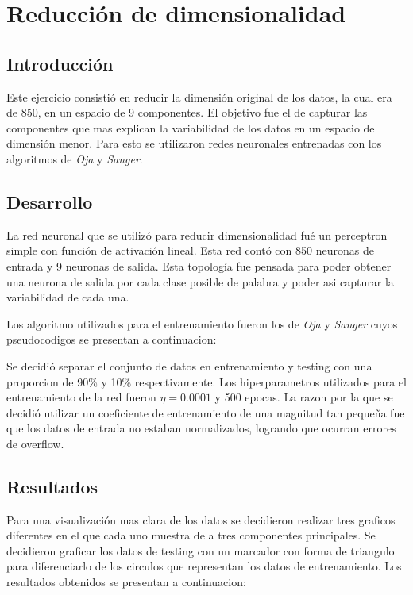 \section{Reducción de dimensionalidad}

\subsection{Introducción}
Este ejercicio consistió en reducir la dimensión original de los datos, la cual era de 850, en un espacio de 9 componentes. El objetivo fue el de capturar
las componentes que mas explican la variabilidad de los datos en un espacio de dimensión menor. Para esto se utilizaron redes neuronales entrenadas con
los algoritmos de \textit{Oja} y \textit{Sanger}.

\subsection{Desarrollo}
La red neuronal que se utilizó para reducir dimensionalidad fué un perceptron simple con función de activación lineal. Esta red contó con 850 neuronas de entrada y
 9 neuronas de salida. Esta topología fue pensada para poder obtener una neurona de salida por cada clase posible de palabra y poder asi capturar la variabilidad de cada
 una.

Los algoritmo utilizados para el entrenamiento fueron los de \textit{Oja} y \textit{Sanger} cuyos pseudocodigos se presentan a continuacion:

Se decidió separar el conjunto de datos en entrenamiento y testing con una proporcion de 90\% y 10\% respectivamente. Los hiperparametros utilizados para el entrenamiento
de la red fueron $\eta = 0.0001$ y 500 epocas. La razon por la que se decidió utilizar un coeficiente de entrenamiento de una magnitud tan pequeña fue que los datos de entrada
no estaban normalizados, logrando que ocurran errores de overflow.

\subsection{Resultados}
Para una visualización mas clara de los datos se decidieron realizar tres graficos diferentes en el que cada uno muestra de a tres componentes principales. Se decidieron graficar los
datos de testing con un marcador con forma de triangulo para diferenciarlo de los circulos que representan los datos de entrenamiento. Los resultados
obtenidos se presentan a continuacion:


